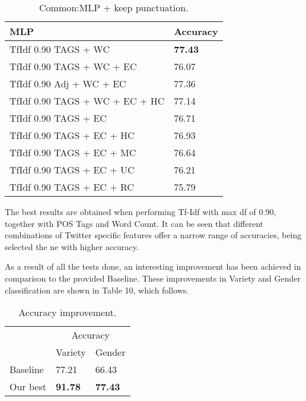 \documentclass[11pt,a4paper]{article}
\begin{document}
\begin{table}[htbp]
\begin{center}
\begin{tabular}{|l|l|}
\hline
MLP & Accuracy \\
\hline \hline
TfIdf 0.90 TAGS + WC & \textbf{77.43} \\ \hline
TfIdf 0.90 TAGS + WC + EC & 76.07 \\ \hline
TfIdf 0.90 Adj + WC + EC & 77.36 \\ \hline
TfIdf 0.90 TAGS + WC + EC + HC & 77.14 \\ \hline
TfIdf 0.90 TAGS + EC & 76.71 \\ \hline
TfIdf 0.90 TAGS + EC + HC & 76.93 \\ \hline
TfIdf 0.90 TAGS + EC + MC & 76.64 \\ \hline
TfIdf 0.90 TAGS + EC + UC & 76.21 \\ \hline
TfIdf 0.90 TAGS + EC + RC & 75.79 \\ \hline
\end{tabular}
\caption{Common:MLP + keep punctuation.}
\label{tabla:sencilla}
\end{center}
\end{table}

The best results are obtained when performing Tf-Idf with max df of 0.90, together with POS Tags and Word Count. It can be seen that different combinations of Twitter specific features offer a narrow range of accuracies, being selected the ne with higher accuracy.

As a result of all the tests done, an interesting improvement has been achieved in comparison to the provided Baseline. These improvements in Variety and Gender classification are shown in Table 10, which follows.

\begin{table}[htbp]
\begin{center}
\begin{tabular}{|l|l|l|}
\hline
& \multicolumn{2}{c|}{Accuracy} \\
\cline{2-3}
& Variety & Gender \\
\hline \hline
Baseline & 77.21 & 66.43 \\ \hline
Our best & \textbf{91.78} & \textbf{77.43} \\ \hline
\end{tabular}
\caption{Accuracy improvement.}
\label{tabla:sencilla}
\end{center}
\end{table}
\end{document}
